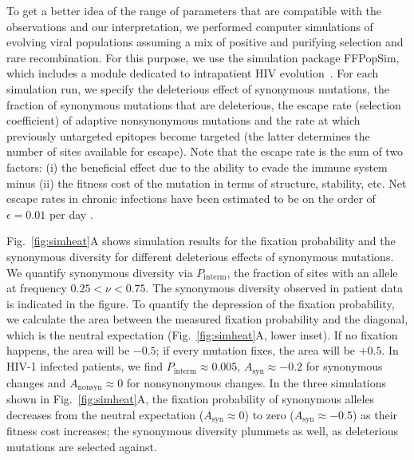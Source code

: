 \documentclass[10pt]{article}
\newcommand{\FIG}[1]{Fig.~\ref{fig:#1}}
\begin{document}
To get a better idea of the range of parameters that are compatible with the
observations and our interpretation, we performed computer simulations of
evolving viral populations assuming a mix of positive and purifying selection
and rare recombination.  For this purpose, we use the simulation package
FFPopSim, which includes a module dedicated to intrapatient HIV
evolution~\cite{zanini_ffpopsim:_2012}. For each simulation run, we specify the
deleterious effect of synonymous mutations, the fraction of synonymous mutations
that are deleterious, the escape rate (selection coefficient) of adaptive 
nonsynonymous mutations and the rate at which previously untargeted epitopes
become targeted (the latter determines the number of sites available for escape). 
Note that the escape rate is the sum of two
factors: (i) the beneficial effect due to the ability to evade the immune system
minus (ii) the fitness cost of the mutation in terms of structure, stability,
etc. Net escape rates in chronic infections have been estimated to be on the
order of $\epsilon = 0.01$ per day \cite{neher_recombination_2010,
Asquith:2006p28003}.

\FIG{simheat}A shows simulation results for the fixation probability and the
synonymous diversity for different deleterious effects of synonymous mutations.
We quantify synonymous diversity via $P_\text{interm}$, the fraction of sites
with an allele at frequency $0.25 < \nu < 0.75$. The synonymous diversity
observed in patient data is indicated in the figure.  To quantify the depression
of the fixation probability, we calculate the area between the measured fixation
probability and the diagonal, which is the neutral expectation
(\FIG{simheat}A, lower inset). If no fixation happens, the area will be
$-0.5$; if every mutation fixes, the area will be $+0.5$. In HIV-1 infected
patients, we find $P_\text{interm} \approx 0.005$, $A_\text{syn} \approx -0.2$
for synonymous changes and $A_\text{nonsyn} \approx 0$ for nonsynonymous
changes. In the three simulations shown in \FIG{simheat}A, the fixation
probability of synonymous alleles decreases from the neutral expectation
($A_\text{syn} \approx 0$) to zero ($A_\text{syn} \approx -0.5$) as their
fitness cost increases; the synonymous diversity plummets as well, as
deleterious mutations are selected against.
\end{document}
